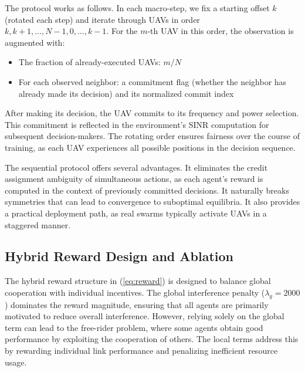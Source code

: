 \documentclass[conference]{IEEEtran}
\begin{document}
The protocol works as follows. In each macro-step, we fix a starting offset $k$ (rotated each step) and iterate through UAVs in order $k, k+1, \ldots, N-1, 0, \ldots, k-1$. For the $m$-th UAV in this order, the observation is augmented with:
\begin{itemize}
    \item The fraction of already-executed UAVs: $m / N$
    \item For each observed neighbor: a commitment flag (whether the neighbor has already made its decision) and its normalized commit index
\end{itemize}

After making its decision, the UAV commits to its frequency and power selection. This commitment is reflected in the environment's SINR computation for subsequent decision-makers. The rotating order ensures fairness over the course of training, as each UAV experiences all possible positions in the decision sequence.

The sequential protocol offers several advantages. It eliminates the credit assignment ambiguity of simultaneous actions, as each agent's reward is computed in the context of previously committed decisions. It naturally breaks symmetries that can lead to convergence to suboptimal equilibria. It also provides a practical deployment path, as real swarms typically activate UAVs in a staggered manner.

\subsection{Hybrid Reward Design and Ablation}

The hybrid reward structure in (\ref{eq:reward}) is designed to balance global cooperation with individual incentives. The global interference penalty ($\lambda_g = 2000$) dominates the reward magnitude, ensuring that all agents are primarily motivated to reduce overall interference. However, relying solely on the global term can lead to the free-rider problem, where some agents obtain good performance by exploiting the cooperation of others. The local terms address this by rewarding individual link performance and penalizing inefficient resource usage.
\end{document}
